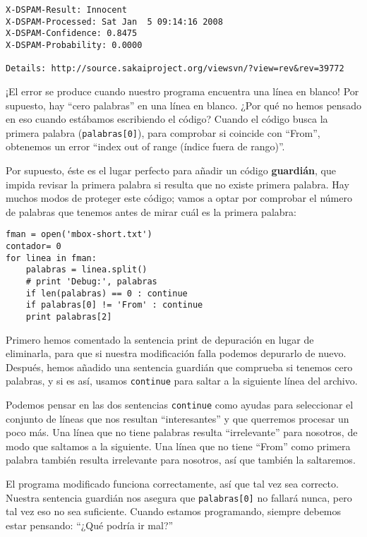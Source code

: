 \begin{enumerate}
\beforeverb
\begin{verbatim}
X-DSPAM-Result: Innocent
X-DSPAM-Processed: Sat Jan  5 09:14:16 2008
X-DSPAM-Confidence: 0.8475
X-DSPAM-Probability: 0.0000

Details: http://source.sakaiproject.org/viewsvn/?view=rev&rev=39772
\end{verbatim}
\afterverb
%
¡El error se produce cuando nuestro programa encuentra una línea en blanco! Por supuesto,
hay ``cero palabras'' en una línea en blanco. ¿Por qué no hemos pensado en eso
cuando estábamos escribiendo el código? Cuando el código busca la primera
palabra (\verb"palabras[0]"), para comprobar si coincide con ``From'',
obtenemos un error ``index out of range (índice fuera de rango)''.

Por supuesto, éste es el lugar perfecto para añadir un código {\bf guardián},
que impida revisar la primera palabra si resulta que no existe primera palabra.
Hay muchos modos de proteger este código; vamos a optar por
comprobar el número de palabras que tenemos antes de mirar cuál es la primera palabra:

\beforeverb
\begin{verbatim}
fman = open('mbox-short.txt')
contador= 0
for linea in fman:
    palabras = linea.split()
    # print 'Debug:', palabras
    if len(palabras) == 0 : continue
    if palabras[0] != 'From' : continue
    print palabras[2]
\end{verbatim}
\afterverb
%
Primero hemos comentado la sentencia print de depuración en lugar de eliminarla,
para que si nuestra modificación falla podemos depurarlo de nuevo. Después, hemos añadido
una sentencia guardián que comprueba si tenemos cero palabras, y si es así,
usamos {\tt continue} para saltar a la siguiente línea del archivo. 

Podemos pensar en las dos sentencias {\tt continue} como ayudas para seleccionar
el conjunto de líneas que nos resultan ``interesantes'' y que querremos
procesar un poco más. Una línea que no tiene palabras resulta ``irrelevante'' para
nosotros, de modo que saltamos a la siguiente. Una línea que no tiene ``From''
como primera palabra también resulta irrelevante para nosotros, así que también la saltaremos.

El programa modificado funciona correctamente, así que tal vez sea correcto. Nuestra
sentencia guardián nos asegura que {\tt palabras[0]} no fallará nunca,
pero tal vez eso no sea suficiente. Cuando estamos programando, siempre debemos
estar pensando: ``¿Qué podría ir mal?''


\end{enumerate}

